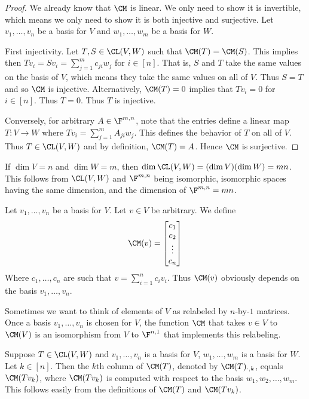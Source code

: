 \documentclass{article}
\begin{document}
  \begin{proof}
    We already know that $\CM$ is linear. We only need to show it is invertible, which means we only need to show it is both injective and surjective. Let $v_1, \dots, v_n$ be a basis for
    $V$ and $w_1, \dots, w_m$ be a basis for $W$. 

    First injectivity. Let $T, S \in \CL(V, W)$ such that $\CM(T) = \CM(S)$. This implies then $Tv_i = Sv_i = \sum_{j = 1}^{m}c_{ji}w_j$ for $i \in [n]$. That is, $S$ and $T$ take the same
    values on the basis of $V$, which means they take the same values on all of $V$. Thus $S = T$ and so $\CM$ is injective. Alternatively, $\CM(T) = 0$ implies that $Tv_i = 0$ for $i \in
    [n]$. Thus $T = 0$. Thus $T$ is injective.

    Conversely, for arbitrary $A \in \F^{m, n}$, note that the entries define a linear map $T: V \to W$ where $Tv_i = \sum_{j = 1}^{m}A_{ji}w_j$. This defines the behavior of $T$ on all of
    $V$. Thus $T \in \CL(V, W)$ and by definition, $\CM(T) = A$. Hence $\CM$ is surjective.
  \end{proof}
  \begin{prop}\label{prop:dim_space_lin_maps}
    If $\dim V = n$ and $\dim W = m$, then $\dim \CL(V, W) = (\dim V)(\dim W) = mn$. This follows from $\CL(V, W)$ and $\F^{m, n}$ being isomorphic, isomorphic spaces having the same
    dimension, and the dimension of $\F^{m, n} = mn$.
  \end{prop}
  \begin{defn}
    Let $v_1, \dots, v_n$ be a basis for $V$. Let $v \in V$ be arbitrary. We define
    \begin{align*}
      \CM(v) =
      \begin{bmatrix}
        c_1 \\ c_2 \\ \vdots \\ c_n
      \end{bmatrix}
    \end{align*}
    Where $c_1, \dots, c_n$ are such that $v = \sum_{i = 1}^{n}c_iv_i$. Thus $\CM(v)$ obviously depends on the basis $v_1, \dots, v_n$.
  \end{defn}
  Sometimes we want to think of elements of $V$ as relabeled by $n$-by-$1$ matrices. Once a basis $v_1, \dots, v_n$ is chosen for $V$, the function $\CM$ that takes $v \in V$ to $\CM(V)$ is
  an isomorphism from $V$ to $\F^{n, 1}$ that implements this relabeling.
  \begin{prop}
    Suppose $T \in \CL(V, W)$ and $v_1, \dots, v_n$ is a basis for $V$, $w_1, \dots, w_m$ is a basis for $W$. Let $k \in [n]$. Then the $k$th column of $\CM(T)$, denoted by $\CM(T)_{\cdot,
    k}$, equals $\CM(Tv_k)$, where $\CM(Tv_k)$ is computed with respect to the basis $w_1, w_2, \dots, w_m$. This follows easily from the definitions of $\CM(T)$ and $\CM(Tv_k)$.
  \end{prop}
\end{document}
